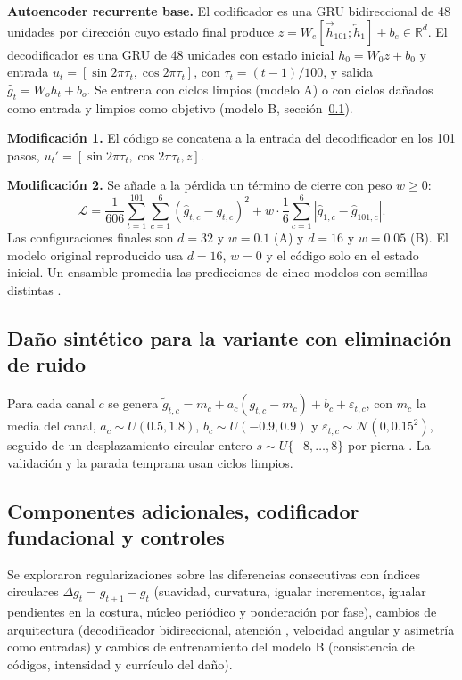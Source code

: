 \documentclass[11pt,a4paper]{article}
\newcommand{\R}{\mathbb{R}}
\begin{document}
\textbf{Autoencoder recurrente base.} El codificador es una GRU \cite{cho2014} bidireccional \cite{schuster1997} de 48 unidades por dirección cuyo estado final produce $z=W_e[\overrightarrow h_{101};\overleftarrow h_1]+b_e\in\R^d$. El decodificador es una GRU de 48 unidades con estado inicial $h_0=W_0z+b_0$ y entrada $u_t=[\sin2\pi\tau_t,\cos2\pi\tau_t]$, con $\tau_t=(t-1)/100$, y salida $\hat g_t=W_oh_t+b_o$. Se entrena con ciclos limpios (modelo A) o con ciclos dañados como entrada y limpios como objetivo (modelo B, sección~\ref{sec:dano}).

\textbf{Modificación 1.} El código se concatena a la entrada del decodificador en los 101 pasos, $u_t'=[\sin2\pi\tau_t,\cos2\pi\tau_t,z]$.

\textbf{Modificación 2.} Se añade a la pérdida un término de cierre con peso $w\ge0$:
\begin{equation}
\mathcal L=\frac{1}{606}\sum_{t=1}^{101}\sum_{c=1}^{6}(\hat g_{t,c}-g_{t,c})^2+w\cdot\frac16\sum_{c=1}^{6}\left|\hat g_{1,c}-\hat g_{101,c}\right| .
\end{equation}
Las configuraciones finales son $d=32$ y $w=0.1$ (A) y $d=16$ y $w=0.05$ (B). El modelo original reproducido usa $d=16$, $w=0$ y el código solo en el estado inicial. Un ensamble promedia las predicciones de cinco modelos con semillas distintas \cite{dietterich2000}.

\subsection{Daño sintético para la variante con eliminación de ruido}
\label{sec:dano}

Para cada canal $c$ se genera $\tilde g_{t,c}=m_c+a_c(g_{t,c}-m_c)+b_c+\varepsilon_{t,c}$, con $m_c$ la media del canal, $a_c\sim U(0.5,1.8)$, $b_c\sim U(-0.9,0.9)$ y $\varepsilon_{t,c}\sim\mathcal N(0,0.15^2)$, seguido de un desplazamiento circular entero $s\sim U\{-8,\dots,8\}$ por pierna \cite{vincent2008}. La validación y la parada temprana usan ciclos limpios.

\subsection{Componentes adicionales, codificador fundacional y controles}
\label{sec:fm_met}

Se exploraron regularizaciones sobre las diferencias consecutivas con índices circulares $\Delta g_t=g_{t+1}-g_t$ (suavidad, curvatura, igualar incrementos, igualar pendientes en la costura, núcleo periódico y ponderación por fase), cambios de arquitectura (decodificador bidireccional, atención \cite{bahdanau2015}, velocidad angular y asimetría como entradas) y cambios de entrenamiento del modelo B (consistencia de códigos, intensidad y currículo del daño).
\end{document}
